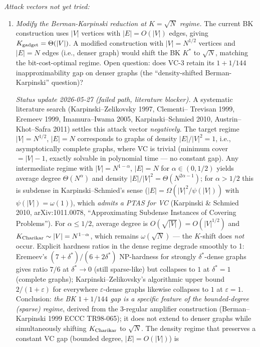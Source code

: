 \documentclass[
]{article}
\begin{document}
\emph{Attack vectors not yet tried:}
\begin{enumerate}
\item \emph{Modify the Berman-Karpinski reduction at $K = \sqrt{N}$
regime.} The current BK construction uses $|V|$ vertices with $|E|
= O(|V|)$ edges, giving $K_{\rm gadget} = \Theta(|V|)$. A modified
construction with $|V| = N^{1/2}$ vertices and $|E| = N$ edges (i.e.,
denser graph) would shift the BK $K^*$ to $\sqrt{N}$, matching the
bit-cost-optimal regime. Open question: does VC-3 retain its
$1 + 1/144$ inapproximability gap on denser graphs (the
``density-shifted Berman-Karpinski'' question)?

\emph{Status update 2026-05-27 (failed path, literature blocker).}
A systematic literature search (Karpinski--Zelikovsky 1997, Clementi--
Trevisan 1999, Eremeev 1999, Imamura--Iwama 2005, Karpinski--Schmied
2010, Austrin--Khot--Safra 2011) settles this attack vector
\emph{negatively}. The target regime $|V| = N^{1/2}$, $|E| = N$
corresponds to graphs of density $|E|/|V|^2 = 1$, i.e., asymptotically
complete graphs, where VC is trivial (minimum cover $= |V| - 1$,
exactly solvable in polynomial time --- no constant gap). Any
intermediate regime with $|V| = N^{1-\alpha}$, $|E| = N$ for
$\alpha \in (0, 1/2)$ yields average degree $\Theta(N^{\alpha})$ and
density $|E|/|V|^2 = \Theta(N^{2\alpha - 1})$; for $\alpha > 1/2$
this is subdense in Karpinski--Schmied's sense ($|E| =
\Omega(|V|^2/\psi(|V|))$ with $\psi(|V|) = \omega(1)$), which
\emph{admits a PTAS for VC} (Karpinski \& Schmied 2010,
arXiv:1011.0078, ``Approximating Subdense Instances of Covering
Problems''). For $\alpha \leq 1/2$, average degree is
$O(\sqrt{|V|}) = O(|V|^{1/2})$ and $K_{\rm Charikar} \sim |V|
= N^{1-\alpha}$, which remains $\omega(\sqrt{N})$ --- the
$K$-shift does \emph{not} occur. Explicit hardness ratios in the
dense regime degrade smoothly to 1: Eremeev's
$(7+\delta^*)/(6+2\delta^*)$ NP-hardness for strongly
$\delta^*$-dense graphs gives ratio $7/6$ at $\delta^* \to 0$
(still sparse-like) but collapses to $1$ at $\delta^* = 1$
(complete graphs); Karpinski--Zelikovsky's algorithmic upper bound
$2/(1+\varepsilon)$ for everywhere $\varepsilon$-dense graphs
likewise collapses to $1$ at $\varepsilon = 1$. Conclusion:
\emph{the BK $1 + 1/144$ gap is a specific feature of the
bounded-degree (sparse) regime}, derived from the 3-regular
amplifier construction (Berman--Karpinski 1999 ECCC TR98-065); it
does not extend to denser graphs while simultaneously shifting
$K_{\rm Charikar}$ to $\sqrt{N}$. The density regime that
preserves a constant VC gap (bounded degree, $|E| = O(|V|)$) is

\end{enumerate}
\end{document}
